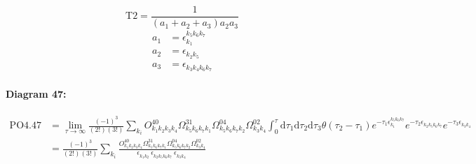 \documentclass[10pt,a4paper]{article}
\begin{document}
\begin{equation}
\text{T}2 = \frac{1}{(a_1+ a_2+ a_3)a_2a_3}\end{equation}
\begin{align*}
a_1 &= \epsilon^{k_{5}k_{6}k_{7}}_{k_{1}}\\
a_2 &= \epsilon^{}_{k_{2}k_{5}}\\
a_3 &= \epsilon^{}_{k_{3}k_{4}k_{6}k_{7}}
\end{align*}
\paragraph{Diagram 47:}
\begin{align}
\text{PO}4.47
&= \lim\limits_{\tau \to \infty}\frac{(-1)^3 }{(2!)(3!)}\sum_{k_i}O^{40}_{k_{1}k_{2}k_{3}k_{4}} \Omega^{31}_{k_{5}k_{6}k_{7}k_{1}} \Omega^{04}_{k_{5}k_{6}k_{7}k_{2}} \Omega^{02}_{k_{3}k_{4}} \int_{0}^{\tau}\mathrm{d}\tau_1\mathrm{d}\tau_2\mathrm{d}\tau_3\theta(\tau_2-\tau_1) e^{-\tau_1 \epsilon^{k_{5}k_{6}k_{7}}_{k_{1}}}e^{-\tau_2 \epsilon^{}_{k_{2}k_{5}k_{6}k_{7}}}e^{-\tau_3 \epsilon^{}_{k_{3}k_{4}}}
 \nonumber \\
&= \frac{(-1)^3 }{(2!)(3!)}\sum_{k_i}\frac{O^{40}_{k_{1}k_{2}k_{3}k_{4}} \Omega^{31}_{k_{5}k_{6}k_{7}k_{1}} \Omega^{04}_{k_{5}k_{6}k_{7}k_{2}} \Omega^{02}_{k_{3}k_{4}} }{\epsilon^{}_{k_{1}k_{2}}\ \epsilon^{}_{k_{2}k_{5}k_{6}k_{7}}\ \epsilon^{}_{k_{3}k_{4}}\ } 
\end{align}
\end{document}
